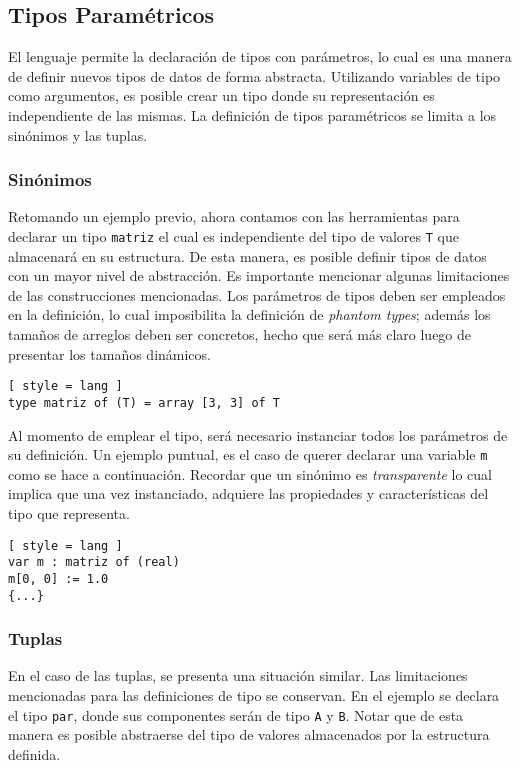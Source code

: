 \subsection{Tipos Paramétricos}

El lenguaje permite la declaración de tipos con parámetros, lo cual es una manera de definir nuevos tipos de datos de forma abstracta.
Utilizando variables de tipo como argumentos, es posible crear un tipo donde su representación es independiente de las mismas.
La definición de tipos paramétricos se limita a los sinónimos y las tuplas.

\subsubsection{Sinónimos}

Retomando un ejemplo previo, ahora contamos con las herramientas para declarar un tipo \lstinline[style = lang]{matriz} el cual es independiente del tipo de valores \lstinline[style = lang]{T} que almacenará en su estructura.
De esta manera, es posible definir tipos de datos con un mayor nivel de abstracción.
Es importante mencionar algunas limitaciones de las construcciones mencionadas.
Los parámetros de tipos deben ser empleados en la definición, lo cual imposibilita la definición de \textit{phantom types}; además los tamaños de arreglos deben ser concretos, hecho que será más claro luego de presentar los tamaños dinámicos.

\begin{lstlisting}[ style = lang ]
type matriz of (T) = array [3, 3] of T
\end{lstlisting}

Al momento de emplear el tipo, será necesario instanciar todos los parámetros de su definición.
Un ejemplo puntual, es el caso de querer declarar una variable \lstinline[style = lang]{m} como se hace a continuación.
Recordar que un sinónimo es \textit{transparente} lo cual implica que una vez instanciado, adquiere las propiedades y características del tipo que representa.

\begin{lstlisting}[ style = lang ]
var m : matriz of (real)
m[0, 0] := 1.0
{...}
\end{lstlisting}

\subsubsection{Tuplas}

En el caso de las tuplas, se presenta una situación similar.
Las limitaciones mencionadas para las definiciones de tipo se conservan.
En el ejemplo se declara el tipo \lstinline[style = lang]{par}, donde sus componentes serán de tipo \lstinline[style = lang]{A} y \lstinline[style = lang]{B}.
Notar que de esta manera es posible abstraerse del tipo de valores almacenados por la estructura definida.

